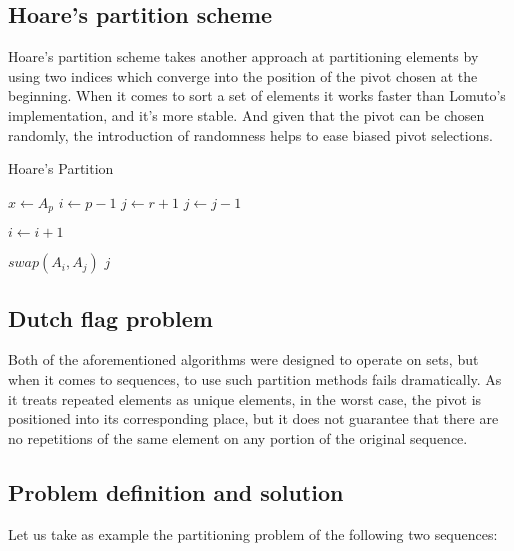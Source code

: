 \subsection{Hoare's partition scheme}

Hoare's partition scheme takes another approach at partitioning elements by using two indices which converge into the position of the pivot chosen at the beginning. When it comes to sort a set of elements it works faster than Lomuto's implementation, and it's more stable. And given that the pivot can be chosen randomly, the introduction of randomness helps to ease biased pivot selections.\\

\begin{algorithm}
\caption{Hoare's Partition}\label{ALG:HOARE_PARTITION}
\begin{algorithmic}[1]
    \State $x \gets A_p$
    \State $i \gets p-1$
    \State $j \gets r+1$
        \Do 
            \State $j \gets j - 1$

        \Do 
            \State $i \gets i + 1$

            \State $swap(A_i, A_j)$
        \Else
            \State \Return $j$
        \EndIf
    \EndWhile
    \EndProcedure
\end{algorithmic}
\end{algorithm}

\subsection{Dutch flag problem}
\label{SUBSEC:DUTCH_FLAG_PROBLEM}

Both of the aforementioned algorithms were designed to operate on sets, but when it comes to sequences, to use such partition methods fails dramatically. As it treats repeated elements as unique elements, in the worst case, the pivot is positioned into its corresponding place, but it does not guarantee that there are no repetitions of the same element on any portion of the original sequence.\\

\subsection{Problem definition and solution}
\label{SUBSECITON:PARTITIONING_PROBLEM}

Let us take as example the partitioning problem of the following two sequences:

